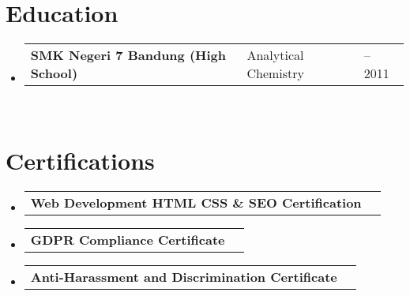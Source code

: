 \documentclass[a4paper, 11pt]{article}
\makeatletter
\newcommand{\resumeSubheading}[4]{
  \vspace{-2pt}\item
    \begin{tabularx}{0.987\textwidth}[t]{
  >{\raggedright\arraybackslash}X
  >{\centering\arraybackslash}X
  >{\raggedleft\arraybackslash}X }
      \textbf{#1} & #2 & #3 \\
    \end{tabularx}
    \textit{\small#4}\\
    \vspace{-7pt}
}
\newcommand{\resumeProjectHeading}[2]{
    \item
    \begin{tabular*}{0.987\textwidth}{l@{\extracolsep{\fill}}r}
      \small#1\\
    \end{tabular*}\vspace{-7pt}
}
\newcommand{\resumeSubHeadingListStart}{\begin{itemize}[leftmargin=0.1in, label={}]}
\newcommand{\resumeSubHeadingListEnd}{\end{itemize}\vspace{5pt}}
\makeatother
\begin{document}
\section{Education}
    \resumeSubHeadingListStart
        \resumeSubheading
            {SMK Negeri 7 Bandung (High School)}{Analytical Chemistry}{2009 -- 2011}{}
    \resumeSubHeadingListEnd

\section{Certifications}
    \resumeSubHeadingListStart
        \resumeProjectHeading
            {\textbf{Web Development HTML CSS \& SEO Certification}}{}
        \resumeProjectHeading
            {\textbf{GDPR Compliance Certificate}}{}
        \resumeProjectHeading
            {\textbf{Anti-Harassment and Discrimination Certificate}}{}
    \resumeSubHeadingListEnd
\end{document}
